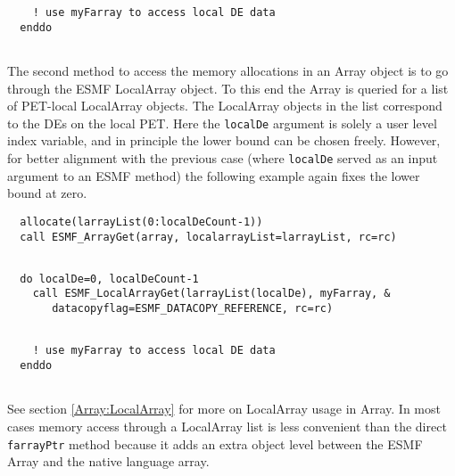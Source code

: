
 \begin{verbatim}
    ! use myFarray to access local DE data
  enddo
 
\end{verbatim}
 

   The second method to access the memory allocations in an Array object is to
   go through the ESMF LocalArray object. To this end the Array is queried
   for a list of PET-local LocalArray objects. The LocalArray objects in the list
   correspond to the DEs on the local PET. Here the {\tt localDe} argument is
   solely a user level index variable, and in principle the lower bound can be 
   chosen freely. However, for better alignment with the previous case (where 
   {\tt localDe} served as an input argument to an ESMF method) the following
   example again fixes the lower bound at zero. 

 \begin{verbatim}
  allocate(larrayList(0:localDeCount-1))
  call ESMF_ArrayGet(array, localarrayList=larrayList, rc=rc)
 
\end{verbatim}
 

 \begin{verbatim}
  do localDe=0, localDeCount-1
    call ESMF_LocalArrayGet(larrayList(localDe), myFarray, &
       datacopyflag=ESMF_DATACOPY_REFERENCE, rc=rc)
 
\end{verbatim}
 

 \begin{verbatim}
    ! use myFarray to access local DE data
  enddo
 
\end{verbatim}
 

   See section \ref{Array:LocalArray} for more on LocalArray usage in Array. 
   In most cases memory access through a LocalArray list is less convenient than
   the direct {\tt farrayPtr} method because it adds an extra object level 
   between the ESMF Array and the native language array. 
  

